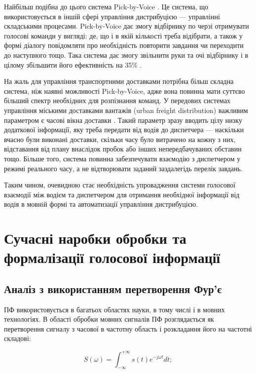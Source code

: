 Найбільш подібна до цього система Pick-by-Voice \cite{Pick-to-Voice}. Це система, що використовується в іншій сфері управління дистрибуцією — управлінні складськими процесами. Pick-by-Voice дає змогу відбірнику по черзі отримувати голосові команди у вигляді: де, що і в якій кількості треба відібрати, а також у формі діалогу повідомляти про необхідність повторити завдання чи переходити до наступного тощо. Така система дає змогу звільнити руки та очі відбірнику і в цілому збільшити його ефективність на 35\% \cite{Baumann_2012}.

На жаль для управління транспортними доставками потрібна більш складна система, ніж наявні можливості Pick-by-Voice, адже вона повинна мати суттєво більший спектр необхідних для розпізнання команд. У передових системах управління міськими доставками вантажів (urban freight distribution) важливим параметром є часові вікна доставки \cite{Quak_2006}. Такий параметр зразу вводить цілу низку додаткової інформації, яку треба передати від водія до диспетчера — наскільки вчасно були виконані доставки, скільки часу було витрачено на кожну з них, відставання від плану внаслідок пробок або інших непередбачуваних обставин тощо. Більше того, система повинна забезпечувати взаємодію з диспетчером у режимі реального часу, а не відтворювати заданий заздалегідь перелік завдань.

Таким чином, очевидною стає необхідність упровадження системи голосової взаємодії між водієм та диспетчером для отримання необхідної інформації від водія в мовнiй формі та автоматизації управління дистрибуцією.

\section{Сучасні наробки обробки та формалізації голосової інформації} \label{sect1_4}

\subsection{Аналіз з використанням перетворення Фур'є}

ПФ використовується в багатьох областях науки, в тому числі і в мовних технологіях. В області обробки мовних сигналів ПФ розглядається як перетворення сигналу з часової в частотну область і розкладання його на частотні складові:

\begin{equation}
\label{eq:equation1}
S(\omega)=\int_{-\infty}^{+\infty}s(t)e^{-j\omega t}dt;
\end{equation}

